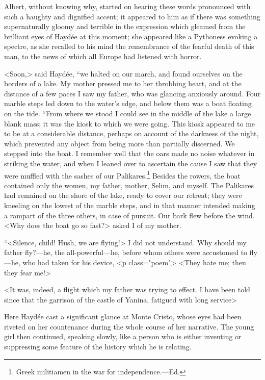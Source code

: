  Albert, without knowing why, started on hearing these words pronounced with such a haughty and dignified accent; it appeared to him as if there was something supernaturally gloomy and terrible in the expression which gleamed from the brilliant eyes of Haydée at this moment; she appeared like a Pythoness evoking a spectre, as she recalled to his mind the remembrance of the fearful death of this man, to the news of which all Europe had listened with horror. 

 <Soon,> said Haydée, “we halted on our march, and found ourselves on the borders of a lake. My mother pressed me to her throbbing heart, and at the distance of a few paces I saw my father, who was glancing anxiously around. Four marble steps led down to the water's edge, and below them was a boat floating on the tide.  “From where we stood I could see in the middle of the lake a large blank mass; it was the kiosk to which we were going. This kiosk appeared to me to be at a considerable distance, perhaps on account of the darkness of the night, which prevented any object from being more than partially discerned. We stepped into the boat. I remember well that the oars made no noise whatever in striking the water, and when I leaned over to ascertain the cause I saw that they were muffled with the sashes of our Palikares.\footnote{Greek militiamen in the war for independence.—Ed. } Besides the rowers, the boat contained only the women, my father, mother, Selim, and myself. The Palikares had remained on the shore of the lake, ready to cover our retreat; they were kneeling on the lowest of the marble steps, and in that manner intended making a rampart of the three others, in case of pursuit. Our bark flew before the wind. <Why does the boat go so fast?> asked I of my mother. 

 “<Silence, child! Hush, we are flying!> I did not understand. Why should my father fly?—he, the all-powerful—he, before whom others were accustomed to fly—he, who had taken for his device,  <p class="poem"> <They hate me; then they fear me!> 

 <It was, indeed, a flight which my father was trying to effect. I have been told since that the garrison of the castle of Yanina, fatigued with long service\longdash> 

 Here Haydée cast a significant glance at Monte Cristo, whose eyes had been riveted on her countenance during the whole course of her narrative. The young girl then continued, speaking slowly, like a person who is either inventing or suppressing some feature of the history which he is relating. 

